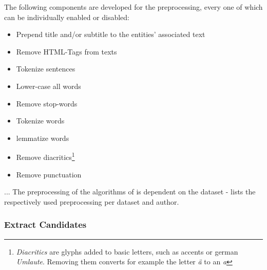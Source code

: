 \FloatBarrier

The following components are developed for the preprocessing, every one of which can be individually enabled or disabled:
\begin{itemize}
	\item Prepend title and/or subtitle to the entities' associated text 
	\item Remove HTML-Tags from texts 
	\item Tokenize sentences 
	\item Lower-case all words
	\item Remove stop-words
	\item Tokenize words
	\item \Gls{lemma}tize words
	\item Remove diacritics\footnote{\emph{Diacritics} are glyphs added to basic letters, such as accents or german \emph{Umlaute}. Removing them converts for example the letter \emph{ä} to an \emph{a}}
	\item Remove punctuation 
\end{itemize}



... The preprocessing of the algorithms of \mainalgos is dependent on the dataset -  lists the respectively used preprocessing per dataset and author.


\subsubsection{Extract Candidates}


